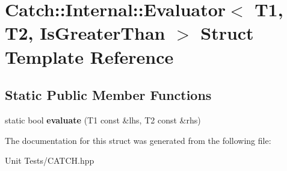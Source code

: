 \hypertarget{structCatch_1_1Internal_1_1Evaluator_3_01T1_00_01T2_00_01IsGreaterThan_01_4}{}\section{Catch\+:\+:Internal\+:\+:Evaluator$<$ T1, T2, Is\+Greater\+Than $>$ Struct Template Reference}
\label{structCatch_1_1Internal_1_1Evaluator_3_01T1_00_01T2_00_01IsGreaterThan_01_4}
\subsection*{Static Public Member Functions}
\begin{DoxyCompactItemize}
\item 
static bool {\bfseries evaluate} (T1 const \&lhs, T2 const \&rhs)\hypertarget{structCatch_1_1Internal_1_1Evaluator_3_01T1_00_01T2_00_01IsGreaterThan_01_4_a55745f74f09ac5c61bd3d592ca5560af}{}\label{structCatch_1_1Internal_1_1Evaluator_3_01T1_00_01T2_00_01IsGreaterThan_01_4_a55745f74f09ac5c61bd3d592ca5560af}

\end{DoxyCompactItemize}


The documentation for this struct was generated from the following file\+:\begin{DoxyCompactItemize}
\item 
Unit Tests/C\+A\+T\+C\+H.\+hpp\end{DoxyCompactItemize}

